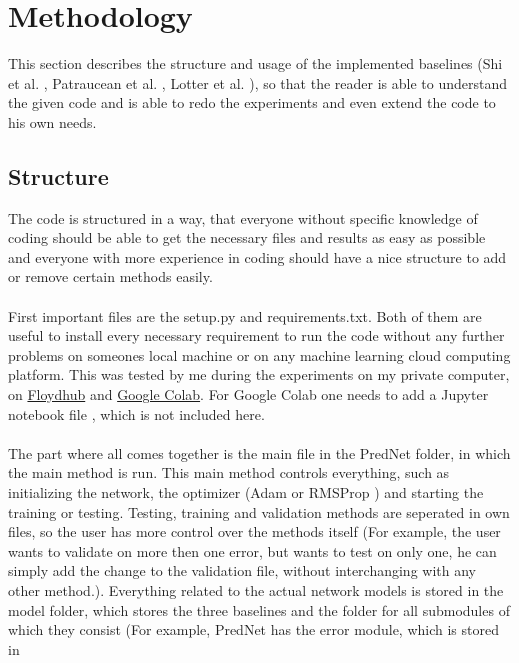 \section{Methodology} \label{section::implementation}
 This section describes the structure and usage of the implemented baselines (Shi et al. \cite{Shi2015}, Patraucean et al. \cite{Patraucean2015},
 Lotter et al. \cite{Lotter2016}), so that the reader is able to understand the given code and is able to redo the experiments and even extend the code to
 his own needs.
  
 \subsection{Structure} \label{subsection::structure}
  The code is structured in a way, that everyone without specific knowledge of coding should be able to get the necessary files and results as easy as possible and
  everyone with more experience in coding should have a nice structure to add or remove certain methods easily.\\\\
  First important files are the setup.py and requirements.txt. Both of them are useful to install every necessary requirement to run the code without any further
  problems on someones local machine or on any machine learning cloud computing platform. This was tested by me during the experiments on my private computer, on 
  \href{www.floydhub.com} {Floydhub} and \href{colab.research.google.com}{Google Colab}.
  For Google Colab one needs to add a Jupyter notebook file \cite{Kluyver2016}, which is not included here.\\\\
  The part where all comes together is the main file in the PredNet folder, in which the main method is run. This main method controls everything, such as 
  initializing the network,
  the optimizer (Adam \cite{Kingma2015} or RMSProp \cite{Ruder2016}) and starting the training or testing. Testing, training and validation methods are seperated 
  in own files, so the user has more 
  control over the methods itself (For example, the user wants to validate on more then one error, but wants to test on only one, he can simply
  add the change to the validation file, without interchanging with any other method.). Everything related to the actual network models is stored in the model 
  folder, which stores the three baselines and the folder for all submodules of which they consist (For example, PredNet has the error module, which is stored in 
